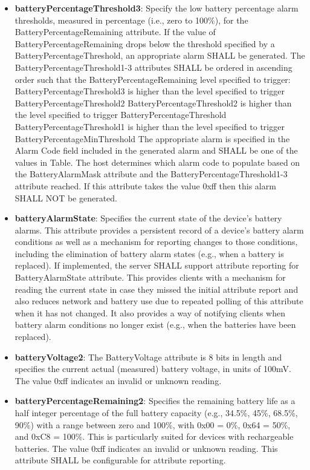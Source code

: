 \begin{itemize}
\item \textbf{batteryPercentageThreshold3}: Specify the low battery percentage alarm thresholds, measured in percentage (i.e., zero to 100\%), for the BatteryPercentageRemaining attribute. If the value of BatteryPercentageRemaining drops below the threshold specified by a BatteryPercentageThreshold, an appropriate alarm SHALL be generated. The BatteryPercentageThreshold1-3 attributes SHALL be ordered in ascending order such that the BatteryPercentageRemaining level specified to trigger: BatteryPercentageThreshold3 is higher than the level specified to trigger BatteryPercentageThreshold2 BatteryPercentageThreshold2 is higher than the level specified to trigger BatteryPercentageThreshold BatteryPercentageThreshold1 is higher than the level specified to trigger BatteryPercentageMinThreshold The appropriate alarm is specified in the Alarm Code field included in the generated alarm and SHALL be one of the values in Table. The host determines which alarm code to populate based on the BatteryAlarmMask attribute and the BatteryPercentageThreshold1-3 attribute reached. If this attribute takes the value 0xff then this alarm SHALL NOT be generated.
\item \textbf{batteryAlarmState}: Specifies the current state of the device's battery alarms. This attribute provides a persistent record of a device's battery alarm conditions as well as a mechanism for reporting changes to those conditions, including the elimination of battery alarm states (e.g., when a battery is replaced). If implemented, the server SHALL support attribute reporting for BatteryAlarmState attribute. This provides clients with a mechanism for reading the current state in case they missed the initial attribute report and also reduces network and battery use due to repeated polling of this attribute when it has not changed. It also provides a way of notifying clients when battery alarm conditions no longer exist (e.g., when the batteries have been replaced).
\item \textbf{batteryVoltage2}: The BatteryVoltage attribute is 8 bits in length and specifies the current actual (measured) battery voltage, in units of 100mV. The value 0xff indicates an invalid or unknown reading.
\item \textbf{batteryPercentageRemaining2}: Specifies the remaining battery life as a half integer percentage of the full battery capacity (e.g., 34.5\%, 45\%, 68.5\%, 90\%) with a range between zero and 100\%, with 0x00 = 0\%, 0x64 = 50\%, and 0xC8 = 100\%. This is particularly suited for devices with rechargeable batteries. The value 0xff indicates an invalid or unknown reading. This attribute SHALL be configurable for attribute reporting.

\end{itemize}
